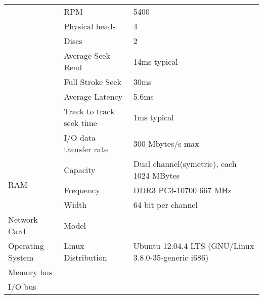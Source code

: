 \documentclass{article}
\begin{document}
\begin{table}[h]
\begin{tabular}{|l|l|l|}
                                       & RPM                      & 5400                                                           \\ \cline{2-3}
                                       & Physical heads           & 4                                                              \\ \cline{2-3}
                                       & Discs                    & 2                                                              \\ \cline{2-3}
                                       & Average Seek Read        & 14ms typical                                                   \\ \cline{2-3}
                                       & Full Stroke Seek         & 30ms                                                           \\ \cline{2-3}
                                       & Average Latency          & 5.6ms                                                          \\ \cline{2-3}
                                       & Track to track seek time & 1ms typical                                                    \\ \cline{2-3}
                                       & I/O data transfer rate   & 300 Mbytes/s max                                               \\ \cline{2-3}
    \hline
    \multirow{3}{*}{RAM}               & Capacity                 & Dual channel(symetric), each 1024 MBytes                       \\ \cline{2-3}
                                       & Frequency                & DDR3 PC3-10700 667 MHz                                         \\ \cline{2-3}
                                       & Width                    & 64 bit per channel                                             \\ \cline{2-3}
    \hline
    \multirow{1}{*}{Network Card}      & Model                    &                                                                \\ \cline{2-3}
    \hline
    \multirow{1}{*}{Operating System}  & Linux Distribution       & Ubuntu 12.04.4 LTS (GNU/Linux 3.8.0-35-generic i686)           \\ \cline{2-3}
    \hline
    Memory bus                         &                          &                                                                \\
    \hline
    I/O bus                            &                          &                                                                \\
    \hline
  \end{tabular}
\end{table}
\end{document}
